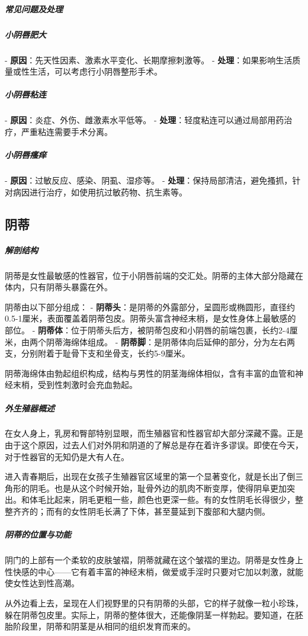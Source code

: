\begin{enumerate}
\subparagraph{常见问题及处理}

\subparagraph{小阴唇肥大}
- \textbf{原因}：先天性因素、激素水平变化、长期摩擦刺激等。
- \textbf{处理}：如果影响生活质量或性生活，可以考虑行小阴唇整形手术。

\subparagraph{小阴唇粘连}
- \textbf{原因}：炎症、外伤、雌激素水平低等。
- \textbf{处理}：轻度粘连可以通过局部用药治疗，严重粘连需要手术分离。

\subparagraph{小阴唇瘙痒}
- \textbf{原因}：过敏反应、感染、阴虱、湿疹等。
- \textbf{处理}：保持局部清洁，避免搔抓，针对病因进行治疗，如使用抗过敏药物、抗生素等。

\subsection{阴蒂}

\subparagraph{解剖结构}
阴蒂是女性最敏感的性器官，位于小阴唇前端的交汇处。阴蒂的主体大部分隐藏在体内，只有阴蒂头暴露在外。

阴蒂由以下部分组成：
- \textbf{阴蒂头}：是阴蒂的外露部分，呈圆形或椭圆形，直径约0.5-1厘米，表面覆盖着阴蒂包皮。阴蒂头富含神经末梢，是女性身体上最敏感的部位。
- \textbf{阴蒂体}：位于阴蒂头后方，被阴蒂包皮和小阴唇的前端包裹，长约2-4厘米，由两个阴蒂海绵体组成。
- \textbf{阴蒂脚}：是阴蒂体向后延伸的部分，分为左右两支，分别附着于耻骨下支和坐骨支，长约5-9厘米。

阴蒂海绵体由勃起组织构成，结构与男性的阴茎海绵体相似，含有丰富的血管和神经末梢，受到性刺激时会充血勃起。

\subparagraph{外生殖器概述}
在女人身上，乳房和臀部特别显眼，而生殖器官和性器官却大部分深藏不露。正是由于这个原因，过去人们对外阴和阴道的了解总是存在着许多谬误。即使在今天，对于性器官的无知仍是大有人在。

进入青春期后，出现在女孩子生殖器官区域里的第一个显著变化，就是长出了倒三角形的阴毛。也是从这个时候开始，耻骨外边的肌肉不断变厚，使得阴阜更加突出。和体毛比起来，阴毛更粗一些，颜色也更深一些。有的女性阴毛长得很少，整整齐齐的；而有的女性阴毛长满了下体，甚至蔓延到下腹部和大腿内侧。

\subparagraph{阴蒂的位置与功能}
阴门的上部有一个柔软的皮肤皱褶，阴蒂就藏在这个皱褶的里边。阴蒂是女性身上性快感的中心——它有着丰富的神经末梢，做爱或手淫时只要对它加以刺激，就能使女性达到性高潮。

从外边看上去，呈现在人们视野里的只有阴蒂的头部，它的样子就像一粒小珍珠，躲在阴蒂包皮里。实际上，阴蒂的整体很大，还能像阴茎一样勃起。要知道，在胚胎阶段里，阴蒂和阴茎是从相同的组织发育而来的。


\end{enumerate}
